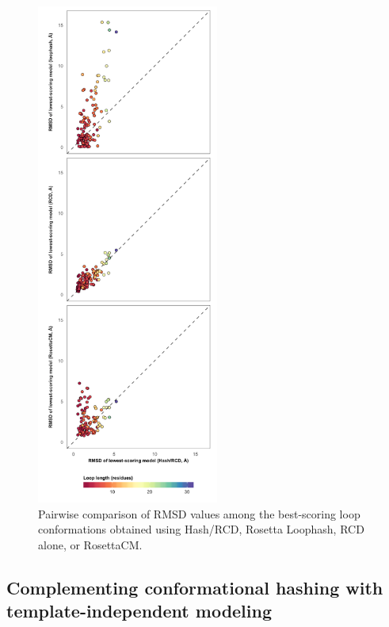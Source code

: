 \begin{figure}
\centering
\includegraphics[width=2.35in]{Figures/loophash_comparison.pdf}
 \caption[Pairwise comparison of RMSD values among the best-scoring loop conformations obtained using Hash/RCD, Rosetta Loophash, RCD alone, or RosettaCM.]{Pairwise comparison of RMSD values among the best-scoring loop conformations obtained using Hash/RCD, Rosetta Loophash, RCD alone, or RosettaCM.}
\label{fig:loophash_comparison}
\end{figure}

\subsection{Complementing conformational hashing with template-independent modeling}


